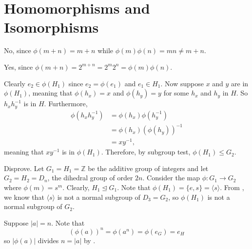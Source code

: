 \section{Homomorphisms and Isomorphisms}
\begin{questions}
    \item \begin{partquestions}{\alph*}
        \item No, since $\phi(m+n) = m + n$ while $\phi(m)\phi(n) = mn \neq m+n$.
        \item Yes, since $\phi(m+n) = 2^{m+n} = 2^m2^n = \phi(m)\phi(n)$.
    \end{partquestions}

    \item Clearly $e_2 \in \phi(H_1)$ since $e_2 = \phi(e_1)$ and $e_1 \in H_1$. Now suppose $x$ and $y$ are in $\phi(H_1)$, meaning that $\phi(h_x) = x$ and $\phi(h_y) = y$ for some $h_x$ and $h_y$ in $H$. So $h_xh_y^{-1}$ is in $H$. Furthermore,
    \begin{align*}
        \phi(h_xh_y^{-1}) &= \phi(h_x)\phi(h_y^{-1})\\
        &= \phi(h_x)\left(\phi(h_y)\right)^{-1}\\
        &= xy^{-1},
    \end{align*}
    meaning that $xy^{-1}$ is in $\phi(H_1)$. Therefore, by subgroup test, $\phi(H_1) \leq G_2$.

    \item Disprove. Let $G_1 = H_1 = \mathbb{Z}$ be the additive group of integers and let $G_2 = H_2 = D_n$, the dihedral group of order $2n$. Consider the map $\phi: G_1 \to G_2$ where $\phi(m) = s^m$. Clearly, $H_1 \unlhd G_1$. Note that $\phi(H_1) = \{e, s\} = \langle s \rangle$. From , we know that $\langle s \rangle$ is not a normal subgroup of $D_3 = G_2$, so $\phi(H_1)$ is not a normal subgroup of $G_2$.

    \item Suppose $|a| = n$. Note that
    \[
        \left(\phi(a)\right)^n = \phi\left(a^n\right) = \phi(e_G) = e_H
    \]
    so $|\phi(a)|$ divides $n = |a|$ by .


\end{questions}
